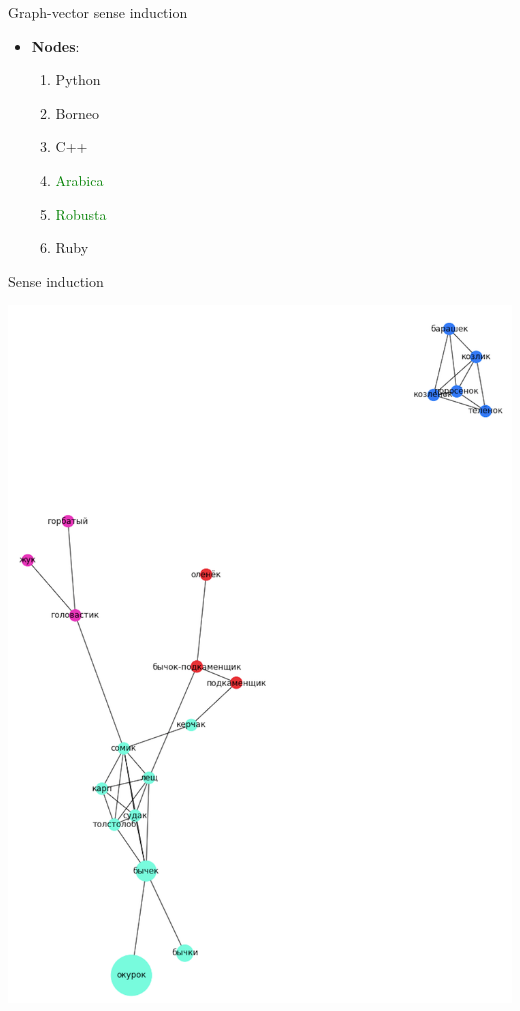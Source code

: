 \begin{frame}{ Graph-vector sense induction }
\begin{itemize}

\item \textbf{Nodes}:

	\begin{enumerate}
	\item \alert{Python}
	\item \textcolor{Cerulean}{Borneo}
	\item \alert{C++}
	\item \textcolor{Green}{Arabica}
    \item \textcolor{Green}{Robusta}
	\item \alert{Ruby}
\end{enumerate}

\end{itemize}
\end{frame}





\begin{frame}{ Sense induction }


 \begin{center}
  	\includegraphics[height=0.69\textheight]{figures/bychok}
  \end{center}
  


\end{frame}




